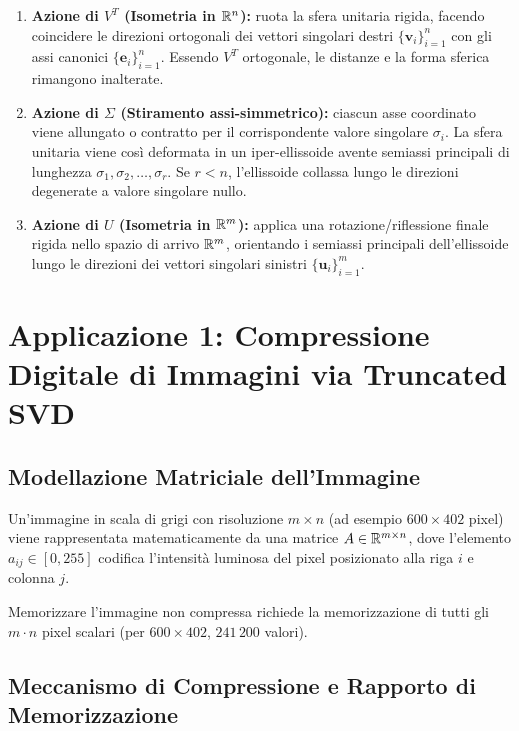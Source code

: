 \begin{enumerate}
    \item \textbf{Azione di $V^T$ (Isometria in $\mathbb{R}^n$):} ruota la sfera unitaria rigida, facendo coincidere le direzioni ortogonali dei vettori singolari destri $\{\mathbf{v}_i\}_{i=1}^n$ con gli assi canonici $\{\mathbf{e}_i\}_{i=1}^n$. Essendo $V^T$ ortogonale, le distanze e la forma sferica rimangono inalterate.
    \item \textbf{Azione di $\Sigma$ (Stiramento assi-simmetrico):} ciascun asse coordinato viene allungato o contratto per il corrispondente valore singolare $\sigma_i$. La sfera unitaria viene cos\`i deformata in un iper-ellissoide avente semiassi principali di lunghezza $\sigma_1, \sigma_2, \dots, \sigma_r$. Se $r < n$, l'ellissoide collassa lungo le direzioni degenerate a valore singolare nullo.
    \item \textbf{Azione di $U$ (Isometria in $\mathbb{R}^m$):} applica una rotazione/riflessione finale rigida nello spazio di arrivo $\mathbb{R}^m$, orientando i semiassi principali dell'ellissoide lungo le direzioni dei vettori singolari sinistri $\{\mathbf{u}_i\}_{i=1}^m$.
\end{enumerate}

\FloatBarrier
\section{Applicazione 1: Compressione Digitale di Immagini via Truncated SVD}
\label{sec:applicazione-compressione-immagini}

\subsection{Modellazione Matriciale dell'Immagine}

Un'immagine in scala di grigi con risoluzione $m \times n$ (ad esempio $600 \times 402$ pixel) viene rappresentata matematicamente da una matrice $A \in \mathbb{R}^{m \times n}$, dove l'elemento $a_{ij} \in [0, 255]$ codifica l'intensit\`a luminosa del pixel posizionato alla riga $i$ e colonna $j$.

Memorizzare l'immagine non compressa richiede la memorizzazione di tutti gli $m \cdot n$ pixel scalari (per $600 \times 402$, $241\,200$ valori).

\subsection{Meccanismo di Compressione e Rapporto di Memorizzazione}

